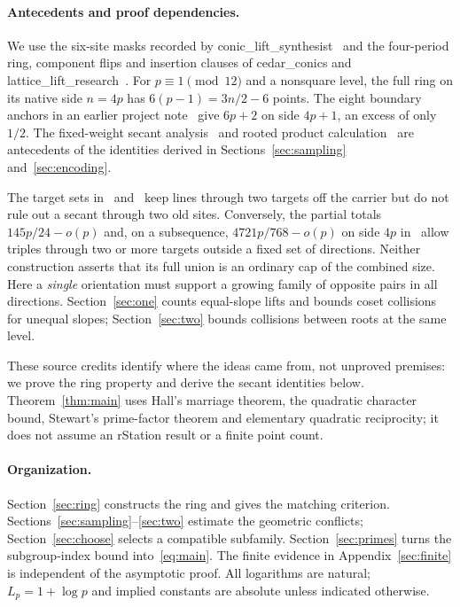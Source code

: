 \documentclass[11pt]{article}
\begin{document}
\paragraph{Antecedents and proof dependencies.} We use the six-site masks recorded by conic\_\allowbreak lift\_\allowbreak synthesist~\cite[\S5.4]{masks} and the four-period ring, component flips and insertion clauses of cedar\_\allowbreak conics and lattice\_\allowbreak lift\_\allowbreak research~\cite{ring}. For $p\equiv1\pmod{12}$ and a nonsquare level, the full ring on its native side $n=4p$ has $6(p-1)=3n/2-6$ points. The eight boundary anchors in an earlier project note~\cite{boundary} give $6p+2$ on side $4p+1$, an excess of only $1/2$. The fixed-weight secant analysis~\cite{ratioante} and rooted product calculation~\cite[\S2]{root} are antecedents of the identities derived in Sections~\ref{sec:sampling} and~\ref{sec:encoding}.

The target sets in~\cite{pair} and~\cite[Theorem 3]{ring} keep lines through two targets off the carrier but do not rule out a secant through two old sites. Conversely, the partial totals $145p/24-o(p)$ and, on a subsequence, $4721p/768-o(p)$ on side $4p$ in~\cite[Theorem 1 and Corollary 4]{root} allow triples through two or more targets outside a fixed set of directions. Neither construction asserts that its full union is an ordinary cap of the combined size. Here a \emph{single} orientation must support a growing family of opposite pairs in all directions. Section~\ref{sec:one} counts equal-slope lifts and bounds coset collisions for unequal slopes; Section~\ref{sec:two} bounds collisions between roots at the same level.

These source credits identify where the ideas came from, not unproved premises: we prove the ring property and derive the secant identities below. Theorem~\ref{thm:main} uses Hall's marriage theorem, the quadratic character bound, Stewart's prime-factor theorem and elementary quadratic reciprocity; it does not assume an rStation result or a finite point count.

\paragraph{Organization.} Section~\ref{sec:ring} constructs the ring and gives the matching criterion. Sections~\ref{sec:sampling}--\ref{sec:two} estimate the geometric conflicts; Section~\ref{sec:choose} selects a compatible subfamily. Section~\ref{sec:primes} turns the subgroup-index bound into~\eqref{eq:main}. The finite evidence in Appendix~\ref{sec:finite} is independent of the asymptotic proof. All logarithms are natural; $L_p=1+\log p$ and implied constants are absolute unless indicated otherwise.
\end{document}

